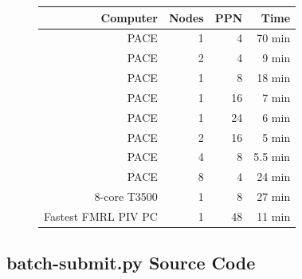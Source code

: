 \documentclass{article}
\begin{document}
\begin{enumerate}
		\begin{figure}[h!]
			\centering
				\begin{tabular}{r | r | r | r}
				Computer & Nodes & PPN & Time \\ \hline
				PACE & 1 & 4 & 70 min \\
				PACE & 2 & 4 & 9 min \\
				PACE & 1 & 8 & 18 min \\
				PACE & 1 & 16 & 7 min \\
				PACE & 1 & 24 & 6 min \\
				PACE & 2 & 16 & 5 min \\
				PACE & 4 & 8 & 5.5 min \\
				PACE & 8 & 4 & 24 min \\
				8-core T3500 & 1 & 8 & 27 min \\
				Fastest FMRL PIV PC & 1 & 48 & 11 min 
			\end{tabular}
		\end{figure}
	\end{enumerate}
	\subsection{batch-submit.py Source Code}
	
    
    \lstset{style=mystyle}
    
	
	
\end{document}
